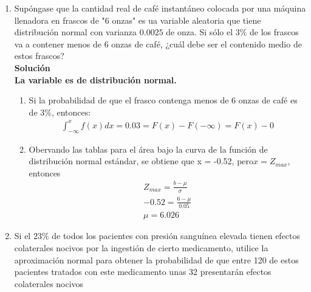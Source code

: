 \begin{enumerate}
    \item Supóngase que la cantidad real de café instantáneo colocada por una máquina llenadora en frascos de "6 onzas" es ua variable aleatoria que tiene distribución normal con varianza $0.0025$ de onza. Si sólo el $3\%$ de los frascos va a contener menos de 6 onzas de café, ¿cuál debe ser el contenido medio de estos frascos?\\
    \textbf{Solución}\\
    \textbf{La variable es de distribución normal.}
    \begin{enumerate}
        \item Si la probabilidad de que el frasco contenga menos de 6 onzas de café es de $3\%$, entonces:
        \begin{gather*}
        \int_{-\infty}^{x}f(x)dx=0.03=F(x)-F(-\infty)=F(x)-0
        \end{gather*}
        \item Obervando las tablas para el área bajo la curva de la función de distribución normal estándar, se obtiene que x = -0.52, pero$x = Z_{max}$, entonces\\
        \begin{gather*}
        Z_{max} = \frac{b-\mu}{\sigma}\\
        -0.52=\frac{6 -\mu}{0.05}\\
        \mu = 6.026
        \end{gather*}
    \end{enumerate}
    
    \item Si el $23\%$ de todos los pacientes con presión sanguínea elevada tienen efectos colaterales nocivos por la ingestión de cierto medicamento, utilice la aproximación normal para obtener la probabilidad de que entre 120 de estos pacientes tratados con este medicamento unas 32 presentarán efectos colaterales nocivos
    

\end{enumerate}
